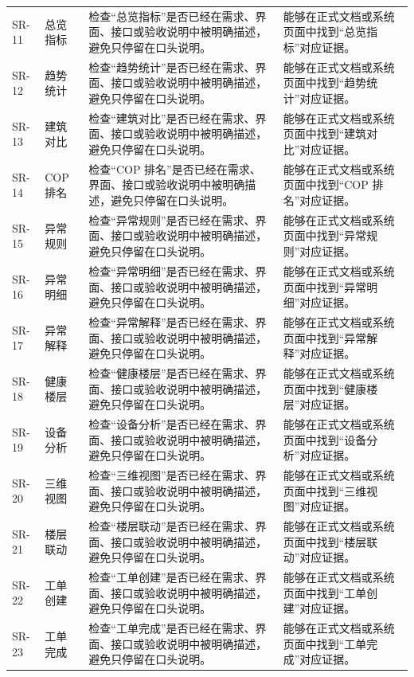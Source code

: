 \documentclass[12pt,a4paper]{ctexart}
\begin{document}
\begin{longtable}{L{1.7cm}L{3.0cm}L{6.2cm}L{4.4cm}}
SR-11 & 总览指标 & 检查“总览指标”是否已经在需求、界面、接口或验收说明中被明确描述，避免只停留在口头说明。 & 能够在正式文档或系统页面中找到“总览指标”对应证据。 \\
SR-12 & 趋势统计 & 检查“趋势统计”是否已经在需求、界面、接口或验收说明中被明确描述，避免只停留在口头说明。 & 能够在正式文档或系统页面中找到“趋势统计”对应证据。 \\
SR-13 & 建筑对比 & 检查“建筑对比”是否已经在需求、界面、接口或验收说明中被明确描述，避免只停留在口头说明。 & 能够在正式文档或系统页面中找到“建筑对比”对应证据。 \\
SR-14 & COP 排名 & 检查“COP 排名”是否已经在需求、界面、接口或验收说明中被明确描述，避免只停留在口头说明。 & 能够在正式文档或系统页面中找到“COP 排名”对应证据。 \\
SR-15 & 异常规则 & 检查“异常规则”是否已经在需求、界面、接口或验收说明中被明确描述，避免只停留在口头说明。 & 能够在正式文档或系统页面中找到“异常规则”对应证据。 \\
SR-16 & 异常明细 & 检查“异常明细”是否已经在需求、界面、接口或验收说明中被明确描述，避免只停留在口头说明。 & 能够在正式文档或系统页面中找到“异常明细”对应证据。 \\
SR-17 & 异常解释 & 检查“异常解释”是否已经在需求、界面、接口或验收说明中被明确描述，避免只停留在口头说明。 & 能够在正式文档或系统页面中找到“异常解释”对应证据。 \\
SR-18 & 健康楼层 & 检查“健康楼层”是否已经在需求、界面、接口或验收说明中被明确描述，避免只停留在口头说明。 & 能够在正式文档或系统页面中找到“健康楼层”对应证据。 \\
SR-19 & 设备分析 & 检查“设备分析”是否已经在需求、界面、接口或验收说明中被明确描述，避免只停留在口头说明。 & 能够在正式文档或系统页面中找到“设备分析”对应证据。 \\
SR-20 & 三维视图 & 检查“三维视图”是否已经在需求、界面、接口或验收说明中被明确描述，避免只停留在口头说明。 & 能够在正式文档或系统页面中找到“三维视图”对应证据。 \\
SR-21 & 楼层联动 & 检查“楼层联动”是否已经在需求、界面、接口或验收说明中被明确描述，避免只停留在口头说明。 & 能够在正式文档或系统页面中找到“楼层联动”对应证据。 \\
SR-22 & 工单创建 & 检查“工单创建”是否已经在需求、界面、接口或验收说明中被明确描述，避免只停留在口头说明。 & 能够在正式文档或系统页面中找到“工单创建”对应证据。 \\
SR-23 & 工单完成 & 检查“工单完成”是否已经在需求、界面、接口或验收说明中被明确描述，避免只停留在口头说明。 & 能够在正式文档或系统页面中找到“工单完成”对应证据。 \\

\end{longtable}
\end{document}
